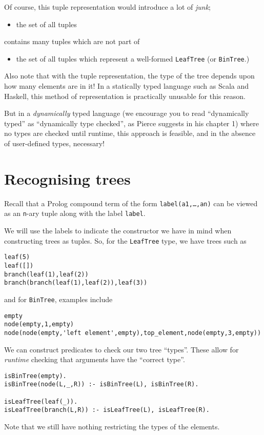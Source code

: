 \documentclass[11pt]{article}
\begin{document}
Of course, this tuple representation would introduce a lot of \emph{junk};
\begin{itemize}
\item the set of all tuples
\end{itemize}
contains many tuples which are not part of
\begin{itemize}
\item the set of all tuples
which represent a well-formed \texttt{LeafTree} (or \texttt{BinTree}.)
\end{itemize}

Also note that with the tuple representation,
the type of the tree depends upon how many elements are in it!
In a statically typed language such as Scala and Haskell,
this method of representation is practically unusable
for this reason.

But in a \emph{dynamically} typed language
(we encourage you to read “dynamically typed” as
“dynamically type checked”, as Pierce suggests in his chapter 1)
where no types are checked until runtime,
this approach is feasible,
and in the absence of user-defined types, necessary!

\section{Recognising trees}
\label{sec:org1319481}
Recall that
a Prolog compound term of the form \texttt{label(a1,…,an)} can be viewed
as an \texttt{n}-ary tuple along with the label \texttt{label}.

We will use the labels to indicate the constructor we have in mind
when constructing trees as tuples.
So, for the \texttt{LeafTree} type, we have trees such as
\begin{verbatim}
leaf(5)
leaf([])
branch(leaf(1),leaf(2))
branch(branch(leaf(1),leaf(2)),leaf(3))
\end{verbatim}
and for \texttt{BinTree}, examples include
\begin{verbatim}
empty
node(empty,1,empty)
node(node(empty,'left element',empty),top_element,node(empty,3,empty))
\end{verbatim}

We can construct predicates to check our two tree “types”.
These allow for \emph{runtime} checking that arguments have the “correct type”. 
\begin{verbatim}
isBinTree(empty).
isBinTree(node(L,_,R)) :- isBinTree(L), isBinTree(R).

isLeafTree(leaf(_)).
isLeafTree(branch(L,R)) :- isLeafTree(L), isLeafTree(R).
\end{verbatim}
Note that we still have nothing restricting the types of the elements.
\end{document}
